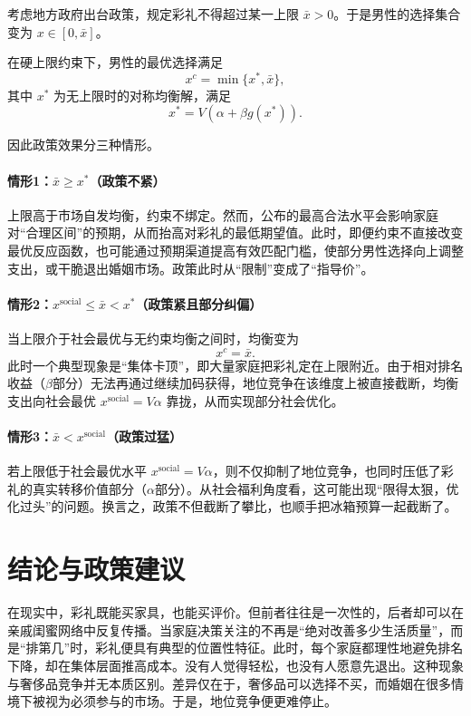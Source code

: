 \documentclass[11pt, a4paper, UTF8]{chinese-erj}
\begin{document}
考虑地方政府出台政策，规定彩礼不得超过某一上限 $\bar x>0$。于是男性的选择集合变为 $x\in[0,\bar x]$。

在硬上限约束下，男性的最优选择满足
\[
x^{c}=\min\{x^*,\bar x\},
\]
其中 $x^*$ 为无上限时的对称均衡解，满足
\[
x^* = V(\alpha+\beta g(x^*)).
\]

因此政策效果分三种情形。

\paragraph{情形1：$\bar x\ge x^*$（政策不紧）}
上限高于市场自发均衡，约束不绑定。然而，公布的最高合法水平会影响家庭对“合理区间”的预期，从而抬高对彩礼的最低期望值。此时，即便约束不直接改变最优反应函数，也可能通过预期渠道提高有效匹配门槛，使部分男性选择向上调整支出，或干脆退出婚姻市场。政策此时从“限制”变成了“指导价”。

\paragraph{情形2：$x^{\text{social}}\le \bar x<x^*$（政策紧且部分纠偏）}
当上限介于社会最优与无约束均衡之间时，均衡变为
\[
x^c=\bar x.
\]
此时一个典型现象是“集体卡顶”，即大量家庭把彩礼定在上限附近。由于相对排名收益（$\beta$部分）无法再通过继续加码获得，地位竞争在该维度上被直接截断，均衡支出向社会最优 $x^{\text{social}}=V\alpha$ 靠拢，从而实现部分社会优化。

\paragraph{情形3：$\bar x<x^{\text{social}}$（政策过猛）}
若上限低于社会最优水平 $x^{\text{social}}=V\alpha$，则不仅抑制了地位竞争，也同时压低了彩礼的真实转移价值部分（$\alpha$部分）。从社会福利角度看，这可能出现“限得太狠，优化过头”的问题。换言之，政策不但截断了攀比，也顺手把冰箱预算一起截断了。


\section{结论与政策建议}

在现实中，彩礼既能买家具，也能买评价。但前者往往是一次性的，后者却可以在亲戚闺蜜网络中反复传播。当家庭决策关注的不再是“绝对改善多少生活质量”，而是“排第几”时，彩礼便具有典型的位置性特征。此时，每个家庭都理性地避免排名下降，却在集体层面推高成本。没有人觉得轻松，也没有人愿意先退出。这种现象与奢侈品竞争并无本质区别。差异仅在于，奢侈品可以选择不买，而婚姻在很多情境下被视为必须参与的市场。于是，地位竞争便更难停止。
\end{document}
